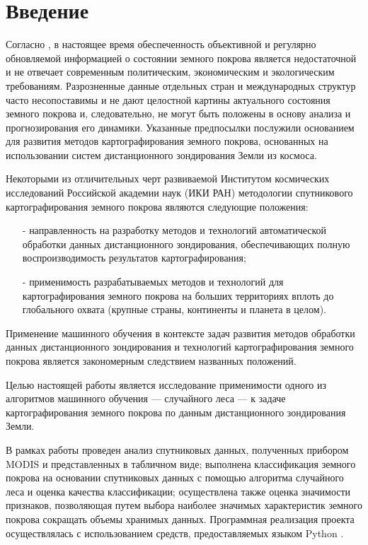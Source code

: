 \documentclass[14pt, a4paper, oneside]{extarticle}
\begin{document}
\tableofcontents
\newpage

\section{Введение}
Согласно \cite{land-cover-mapping-article}, в настоящее время обеспеченность объективной и регулярно обновляемой информацией о состоянии земного покрова является недостаточной и не отвечает современным политическим, экономическим и экологическим требованиям. Разрозненные данные отдельных стран и международных структур часто несопоставимы и не дают целостной картины актуального состояния земного покрова и, следовательно, не могут быть положены в основу анализа и прогнозирования его 
динамики. Указанные предпосылки послужили основанием для развития методов картографирования земного покрова, основанных на использовании систем дистанционного зондирования Земли из космоса.

Некоторыми из отличительных черт развиваемой Институтом космических исследований Российской академии наук (ИКИ РАН) методологии 
спутникового картографирования земного покрова являются следующие положения:
\begin{itemize}
    \item[-] направленность на разработку методов и технологий автоматической обработки данных дистанционного зондирования, обеспечивающих полную воспроизводимость результатов картографирования;
    \item[-] применимость разрабатываемых методов и технологий для картографирования земного покрова на больших территориях вплоть до глобального охвата (крупные страны, континенты и планета в целом).
\end{itemize}

Применение машинного обучения в контексте задач развития методов обработки данных дистанционного зондирования и технологий картографирования земного покрова является закономерным следствием названных положений.

Целью настоящей работы является исследование применимости одного из алгоритмов машинного обучения --- случайного леса --- к задаче картографирования земного покрова по данным дистанционного зондирования Земли.

В рамках работы проведен анализ спутниковых данных, полученных прибором MODIS и представленных в табличном виде; выполнена классификация земного покрова на основании спутниковых данных с помощью алгоритма случайного леса и оценка качества классификации; осуществлена также оценка значимости признаков, позволяющая путем выбора наиболее значимых характеристик земного покрова сокращать объемы хранимых данных. Программная реализация проекта осуществлялась с использованием средств, предоставляемых языком Python \cite{python}.
\end{document}
